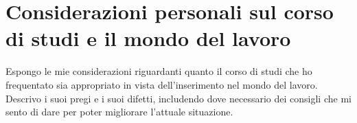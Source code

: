 	\section{Considerazioni personali sul corso di studi e il mondo del lavoro}
		Espongo le mie considerazioni riguardanti quanto il corso di studi che ho frequentato sia appropriato in vista dell'inserimento
		nel mondo del lavoro. Descrivo i suoi pregi e i suoi difetti, includendo dove necessario dei consigli che mi sento di dare per
		poter migliorare l'attuale situazione.
